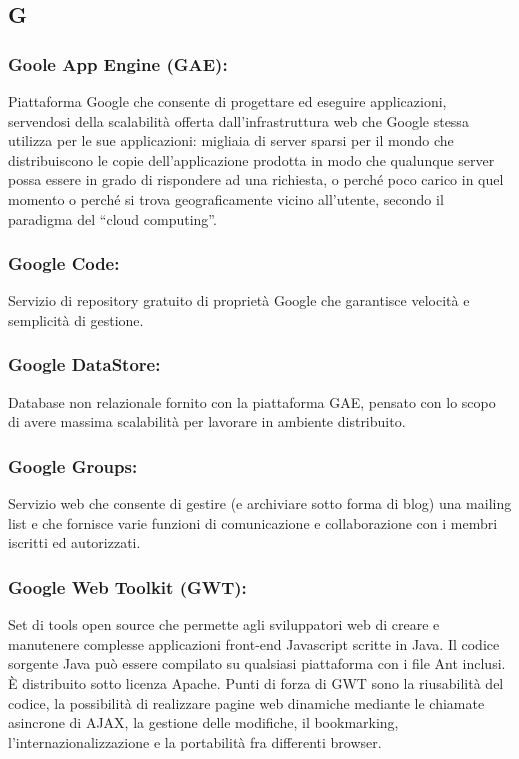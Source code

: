 \subsection*{\huge{G}}

\subsubsection*{Goole App Engine (GAE):} Piattaforma Google che consente di
progettare ed eseguire applicazioni, servendosi della scalabilit\`a offerta
dall'infrastruttura web che Google stessa utilizza per le sue applicazioni:
migliaia di server sparsi per il mondo che distribuiscono le copie
dell'applicazione prodotta in modo che qualunque server possa essere in grado di
rispondere ad una richiesta, o perch\'e poco carico in quel momento o perch\'e
si trova geograficamente vicino all'utente, secondo il paradigma del ``cloud computing''.

\subsubsection*{Google Code:} Servizio di repository gratuito di
propriet\`a Google che garantisce velocit\`a e semplicit\`a di gestione.

\subsubsection*{Google DataStore:} Database non relazionale fornito con la
piattaforma GAE, pensato con lo scopo di avere massima scalabilit\`a per
lavorare in ambiente distribuito.

\subsubsection*{Google Groups:} Servizio web che consente di gestire (e
archiviare sotto forma di blog) una mailing list e che fornisce varie funzioni
di comunicazione e collaborazione con i membri iscritti ed autorizzati.

\subsubsection*{Google Web Toolkit (GWT):} Set di tools open source che
permette agli sviluppatori web di creare e manutenere complesse applicazioni front-end
Javascript scritte in Java. Il codice sorgente Java pu\`o essere compilato su
qualsiasi piattaforma con i file Ant inclusi. \`E distribuito sotto licenza
Apache. Punti di forza di GWT sono la riusabilit\`a del codice, la possibilit\`a di
realizzare pagine web dinamiche mediante le chiamate asincrone di AJAX, la
gestione delle modifiche, il bookmarking, l'internazionalizzazione e la
portabilit\`a fra differenti browser.

